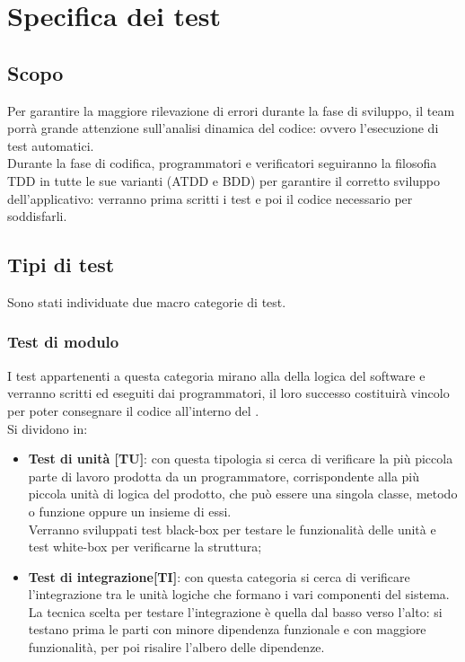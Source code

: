 \documentclass[PianoDiProgetto.tex]{subfiles}
\begin{document}
\chapter{Specifica dei test}

\section{Scopo}
Per garantire la maggiore rilevazione di errori durante la fase di sviluppo, il team porrà grande attenzione sull'analisi dinamica del codice: ovvero l'esecuzione di test automatici. \\
Durante la fase di codifica, programmatori e verificatori seguiranno la filosofia TDD in tutte le sue varianti (ATDD e BDD) per garantire il corretto sviluppo dell'applicativo: verranno prima scritti i test e poi il codice necessario per soddisfarli.

\section{Tipi di test}
Sono stati individuate due macro categorie di test.

\subsection{Test di modulo}
I test appartenenti a questa categoria mirano alla  della logica del software e verranno scritti ed eseguiti dai programmatori, il loro successo costituirà vincolo per poter consegnare il codice all'interno del . \\
Si dividono in:
\begin{itemize}
	\item \textbf{Test di unità [TU]}: con questa tipologia si cerca di verificare la più piccola parte di lavoro prodotta da un programmatore, corrispondente alla più piccola unità di logica del prodotto, che può essere una singola classe, metodo o funzione oppure un insieme di essi. \\
	Verranno sviluppati test black-box per testare le funzionalità delle unità e test white-box per verificarne la struttura;
	\item \textbf{Test di integrazione[TI]}: con questa categoria si cerca di verificare l'integrazione tra le unità logiche che formano i vari componenti del sistema.\\
	La tecnica scelta per testare l'integrazione è quella dal basso verso l'alto: si testano prima le parti con minore dipendenza funzionale e con maggiore funzionalità, per poi risalire l'albero delle dipendenze.\\
\end{itemize}
\end{document}
